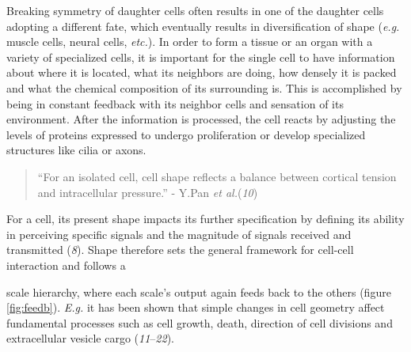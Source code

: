 \documentclass[10pt, b5paper, singlespacinge, twoside]{reedthesis} %
\theoremstyle{definition}
\theoremstyle{definition}
\theoremstyle{definition}
\theoremstyle{remark}
\begin{document}
Breaking symmetry of daughter cells often results in one of the daughter cells adopting a different fate, which eventually results in diversification of shape (\emph{e.g.} muscle cells, neural cells, \emph{etc.}). In order to form a tissue or an organ with a variety of specialized cells, it is important for the single cell to have information about where it is located, what its neighbors are doing, how densely it is packed and what the chemical composition of its surrounding is. This is accomplished by being in constant feedback with its neighbor cells and sensation of its environment. After the information is processed, the cell reacts by adjusting the levels of proteins expressed to undergo proliferation or develop specialized structures like cilia or axons.
\begin{quote}
``For an isolated cell, cell shape reflects a balance between cortical tension and intracellular pressure.'' - Y.Pan \emph{et al.}(\emph{10})
\end{quote}
For a cell, its present shape impacts its further specification by defining its ability in perceiving specific signals and the magnitude of signals received and transmitted (\emph{8}). Shape therefore sets the general framework for cell-cell interaction and follows a\newline

\newline

scale hierarchy, where each scale's output again feeds back to the others (figure \ref{fig:feedb}). \emph{E.g.} it has been shown that simple changes in cell geometry affect fundamental processes such as cell growth, death, direction of cell divisions and extracellular vesicle cargo (\emph{11}--\emph{22}).
\end{document}
